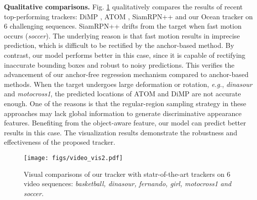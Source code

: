 \documentclass[runningheads]{llncs}
\begin{document}
\noindent\textbf{Qualitative comparisons.} 
Fig. \ref{FIG1} qualitatively compares the results of recent top-performing trackers: DiMP \cite{DiMP}, ATOM \cite{ATOM}, SiamRPN++ \cite{SiamRPN++} and our Ocean tracker on 6 challenging sequences. SiamRPN++ drifts from the target when fast motion occurs (\emph{soccer}). The underlying reason is that fast motion results in imprecise prediction, which is difficult to be rectified by the anchor-based method. By contrast, our model performs better in this case, since it is capable of rectifying inaccurate bounding boxes and robust to noisy predictions. 
This verifies the advancement of our anchor-free regression mechanism compared to anchor-based methods. When the target undergoes large deformation or rotation, \emph{e.g.}, \emph{dinasour} and \emph{motocross1},  the predicted locations of ATOM and DiMP are not accurate enough. One of the reasons is that the regular-region sampling strategy in these approaches may lack global information to generate discriminative appearance features. Benefiting from the object-aware feature, our model can predict better results in this case. The visualization results demonstrate the robustness and effectiveness of the proposed tracker. 

\begin{figure}[!t]
\begin{center}
		\vspace{-0.5em}
		
		\texttt{[image: figs/video\_vis2.pdf]}
		\vspace{-2.5em}
		\caption{Visual comparisons of our tracker with statr-of-the-art trackers on 6 video sequences:
			\emph{basketball, dinasour, fernando, girl, motocross1 and soccer.}}
		
		
		\label{FIG1}
	\end{center}
	\vspace{-2.7em}
\end{figure}
\end{document}
